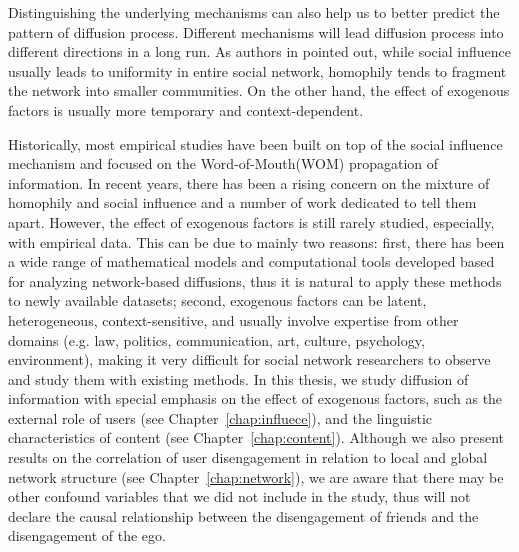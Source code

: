 \documentclass[phd,tocprelim]{cornell}
\begin{document}
Distinguishing the underlying mechanisms can also help us to better predict the pattern of diffusion process. Different mechanisms will lead diffusion process into different directions in a long run. As authors in \cite{Crandall:2008} pointed out, while social influence usually leads to uniformity in entire social network, homophily tends to fragment the network into smaller communities. On the other hand, the effect of exogenous factors is usually more temporary and context-dependent.

Historically, most empirical studies have been built on top of the social influence mechanism and focused on the Word-of-Mouth(WOM) propagation of information. In recent years, there has been a rising concern on the mixture of homophily and social influence and a number of work dedicated to tell them apart\cite{Anagnostopoulos-2008,Crandall:2008,Aral:2009,Aral-2012}. However, the effect of exogenous factors is still rarely studied, especially, with empirical data. This can be due to mainly two reasons: first, there has been a wide range of mathematical models and computational tools developed based for analyzing network-based diffusions, thus it is natural to apply these methods to newly available datasets; second, exogenous factors can be latent, heterogeneous, context-sensitive, and usually involve expertise from other domains (e.g. law, politics, communication, art, culture, psychology, environment), making it very difficult for social network researchers to observe and study them with existing methods. In this thesis, we study diffusion of information with special emphasis on the effect of exogenous factors, such as the external role of users (see Chapter~\ref{chap:influece}), and the linguistic characteristics of content (see Chapter~\ref{chap:content}). Although we also present results on the correlation of user disengagement in relation to local and global network structure (see Chapter~\ref{chap:network}), we are aware that there may be other confound variables that we did not include in the study, thus will not declare the causal relationship between the disengagement of friends and the disengagement of the ego. 


\end{document}
